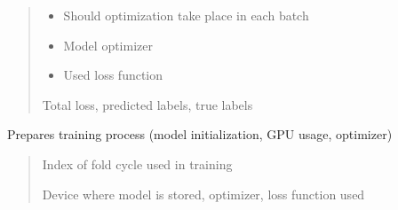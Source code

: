 \documentclass[letterpaper,10pt,english]{sphinxmanual}
\begin{document}
\begin{fulllineitems}
\begin{fulllineitems}
\begin{quote}
\begin{description}
\begin{itemize}
\item {} 
\sphinxAtStartPar
{} \textendash{} Should optimization take place in each batch

\item {} 
\sphinxAtStartPar
{} \textendash{} Model optimizer

\item {} 
\sphinxAtStartPar
{} \textendash{} Used loss function

\end{itemize}

\sphinxAtStartPar
Total loss, predicted labels, true labels

\end{description}\end{quote}

\end{fulllineitems}


\begin{fulllineitems}
\label{\detokenize{net:net.UVANEMO.__train_prepare}}
\pysigstartsignatures
{}
\pysigstopsignatures
\sphinxAtStartPar
Prepares training process (model initialization, GPU usage, optimizer)
\begin{quote}\begin{description}
\sphinxAtStartPar
{} \textendash{} Index of fold cycle used in training

\sphinxAtStartPar
Device where model is stored, optimizer, loss function used

\end{description}\end{quote}

\end{fulllineitems}



\end{fulllineitems}
\end{document}
